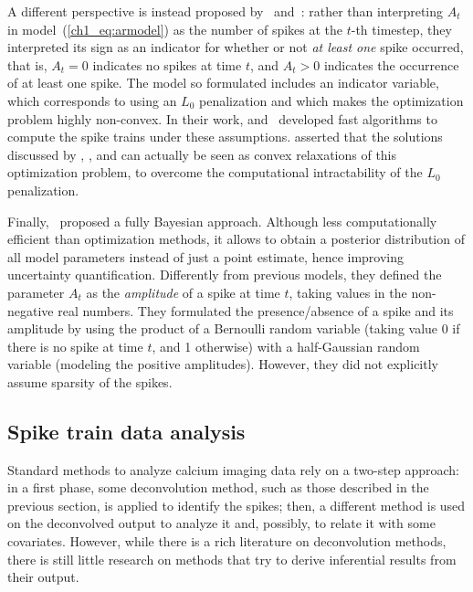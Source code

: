 A different perspective is instead proposed by~\textcite{jewell2018} and~\textcite{jewell2019}: rather than interpreting $A_t$ in model~(\ref{ch1_eq:armodel}) as the number of spikes at the $t$-th timestep, they interpreted its sign as an indicator for whether or not \textit{at least one} spike occurred, that is, $A_t = 0$ indicates no spikes at time $t$, and $A_t>0$ indicates the occurrence of at least one spike. The model so formulated includes an indicator variable, which corresponds to using an $L_0$ penalization and which makes the optimization problem highly non-convex. 
In their work, \textcite{jewell2018} and~\textcite{jewell2019} developed fast algorithms to compute the spike trains under these assumptions.
\textcite{jewell2018} asserted that the solutions discussed by \textcite{vogelstein2010}, \textcite{friedrich2016}, and \textcite{friedrich2017} can actually be seen as convex relaxations of this optimization problem, to overcome the computational intractability of the $L_0$ penalization. 

Finally,~\textcite{pnevmatikakis2013} proposed a fully Bayesian approach. Although less computationally efficient than optimization methods, it allows to obtain a posterior distribution of all model parameters instead of just a point estimate, hence improving uncertainty quantification.
Differently from previous models, they defined the parameter $A_t$ as the \textit{amplitude} of a spike at time $t$, taking values in the non-negative real numbers.
They formulated the presence/absence of a spike and its amplitude by using the product of a Bernoulli random variable (taking value 0 if there is no spike at time $t$, and 1 otherwise) with a half-Gaussian random variable (modeling the positive amplitudes). However, they did not explicitly assume sparsity of the spikes.


\subsection{Spike train data analysis}
\label{ch1_sec:spike_train_analysis}
Standard methods to analyze calcium imaging data rely on a two-step approach: in a first phase, some deconvolution method, such as those described in the previous section, is applied to identify the spikes; then, a different method is used on the deconvolved output to analyze it and, possibly, to relate it with some covariates.
However, while there is a rich literature on deconvolution methods, there is still little research on methods that try to derive inferential results from their output.

